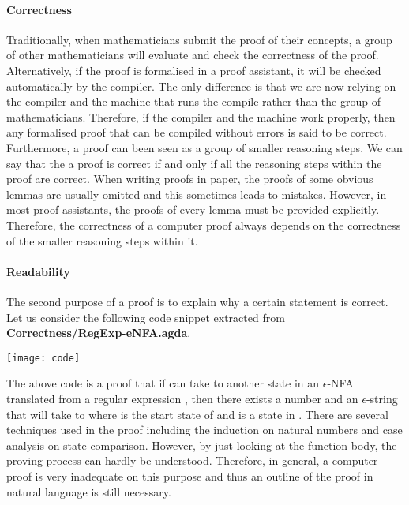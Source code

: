 \paragraph{Correctness} Traditionally, when mathematicians submit
the proof of their concepts, a group of other mathematicians will
evaluate and check the correctness of the proof. Alternatively, if the
proof is formalised in a proof assistant, it will be checked 
automatically by the compiler. The only difference is that we are now
relying on the compiler and the machine that runs the compile rather
than the group of mathematicians. Therefore, if the compiler and the
machine work properly, then any formalised proof that
can be compiled without errors is said to be correct. Furthermore, a
proof can been seen as a group of smaller reasoning steps. We can say that the a proof is correct if and only if all the
reasoning steps within the proof are correct. When writing proofs in paper, the proofs of
some obvious lemmas are usually omitted and this sometimes leads to mistakes. However, in
most proof assistants, the proofs of every lemma must be provided explicitly. Therefore, the correctness of
a computer proof always depends on the correctness of the smaller reasoning steps within it. 

\paragraph{Readability} The second purpose of a proof is to explain why
a certain statement is correct. Let us consider the following code
snippet extracted from \textbf{Correctness/RegExp-eNFA.agda}. 
\begin{center} \texttt{[image: code]} \end{center}

\par The above code is a proof that if  can take  to
another state  in an \(\epsilon\)-NFA translated from a
regular expression , then there exists a number  and
an \(\epsilon\)-string  that will take  to  where
 is the start state of  and  is a state in
. There are several techniques used in the proof including the 
induction on natural numbers and case analysis on state comparison. However, by
just looking at the function body, the proving process can hardly be
understood. Therefore, in general, a computer proof is very inadequate on
this purpose and thus an outline of the proof in natural language is
still necessary. 

